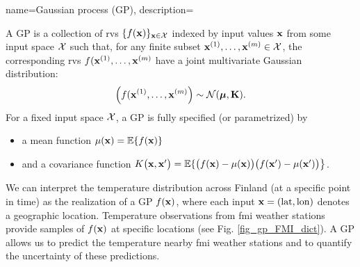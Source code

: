 {name={Gaussian process (GP)}, 
  description={A GP is a collection of \gls{rv}s 
  	$\{f({\bf x})\}_{{\bf x} \in \mathcal{X}}$ indexed by input values ${\bf x}$ 
  	from some input space $\mathcal{X}$ such that, for any finite subset 
  	${\bf x}^{(1)}, \ldots, {\bf x}^{(m)} \in \mathcal{X}$, 
  	the corresponding \gls{rv}s $f({\bf x}^{(1)}, \ldots, {\bf x}^{(m)}$ have a joint 
  	multivariate Gaussian distribution:
  	\[
  	\left( f({\bf x}^{(1)}, \ldots, {\bf x}^{(m)} \right) \sim \mathcal{N}(\boldsymbol{\mu}, \mathbf{K}).
  	\]
  	For a fixed input space $\mathcal{X}$, a GP is fully specified (or parametrized) by 
  	\begin{itemize}
  		\item a \gls{mean} \gls{function} $\mu({\bf x}) = \mathbb{E}\{ f({\bf x})\}$
  		\item and a \gls{covariance} \gls{function} $K\big({\bf x},{\bf x}'\big)= \mathbb{E}\{ \big(f({\bf x})-\mu({\bf x})\big) \big(f({\bf x}')-\mu({\bf x}')\big) \big\}$.
  	\end{itemize}
  	 We can interpret the temperature distribution across Finland (at a specific 
  	point in time) as the \gls{realization} of a GP $f({\bf x})$, where each input ${\bf x} = (\text{lat}, \text{lon})$ 
  	denotes a geographic location. Temperature observations from \gls{fmi} weather stations provide 
  	\gls{sample}s of $f({\bf x})$ at specific locations (see Fig. \ref{fig_gp_FMI_dict}). A GP allows us to 
  	predict the temperature nearby \gls{fmi} weather stations and to quantify the \gls{uncertainty} 
  	of these \gls{prediction}s. 
  	\begin{figure}[H]
  	\begin{center}
\end{center}
\end{figure}}}
